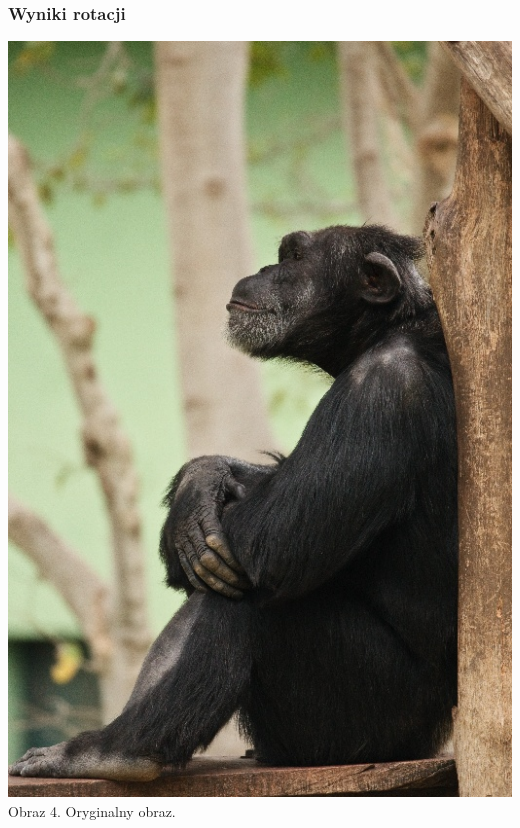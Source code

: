 \documentclass[14pt]{article}
\begin{document}
\subsubsection{Wyniki rotacji}
\begin{center}
    \vspace{1cm}
    \includegraphics[scale=0.2]{images/monke_512.jpg}
    \\ \small Obraz 4. Oryginalny obraz.


\end{center}
\end{document}
